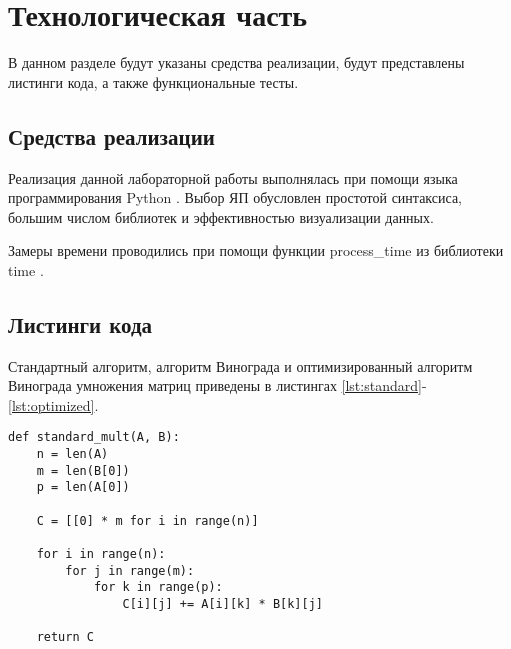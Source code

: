 \chapter{Технологическая часть}

В данном разделе будут указаны средства реализации, будут представлены листинги кода, а также функциональные тесты.

\section{Средства реализации}

Реализация данной лабораторной работы выполнялась при помощи языка программирования Python \cite{python}. Выбор ЯП обусловлен простотой синтаксиса, большим числом библиотек и эффективностью визуализации данных.

Замеры времени проводились при помощи функции process\_time из библиотеки time \cite{python-time}.

\section{Листинги кода}

Стандартный алгоритм, алгоритм Винограда и оптимизированный алгоритм Винограда умножения матриц приведены в листингах \ref{lst:standard}-\ref{lst:optimized}.

\begin{center}
\captionsetup{justification=raggedright,singlelinecheck=off}
\begin{lstlisting}[label=lst:standard,caption=Стандартный алгоритм умножения матриц]
def standard_mult(A, B):
    n = len(A)
    m = len(B[0])
    p = len(A[0])

    C = [[0] * m for i in range(n)]

    for i in range(n):
        for j in range(m):
            for k in range(p):
                C[i][j] += A[i][k] * B[k][j]

    return C
\end{lstlisting} 
\end{center}

